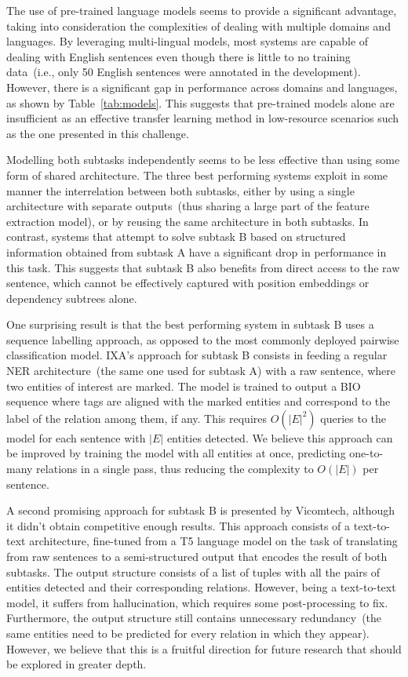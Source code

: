 \documentclass[a4paper,11pt,twocolumn,twoside]{article}
\begin{document}
The use of pre-trained language models seems to provide a significant advantage, taking into consideration the complexities of dealing with multiple domains and languages.
By leveraging multi-lingual models, most systems are capable of dealing with English sentences even though there is little to no training data~(i.e., only 50 English sentences were annotated in the development).
However, there is a significant gap in performance across domains and languages, as shown by Table~\ref{tab:models}.
This suggests that pre-trained models alone are insufficient as an effective transfer learning method in low-resource scenarios such as the one presented in this challenge.

Modelling both subtasks independently seems to be less effective than using some form of shared architecture.
The three best performing systems exploit in some manner the interrelation between both subtasks, either by using a single architecture with separate outputs~(thus sharing a large part of the feature extraction model), or by reusing the same architecture in both subtasks.
In contrast, systems that attempt to solve subtask B based on structured information obtained from subtask A have a significant drop in performance in this task.
This suggests that subtask B also benefits from direct access to the raw sentence, which cannot be effectively captured with position embeddings or dependency subtrees alone.

One surprising result is that the best performing system in subtask B uses a sequence labelling approach, as opposed to the most commonly deployed pairwise classification model.
IXA's approach for subtask B consists in feeding a regular NER architecture~(the same one used for subtask A) with a raw sentence, where two entities of interest are marked.
The model is trained to output a BIO sequence where tags are aligned with the marked entities and correspond to the label of the relation among them, if any.
This requires $O(|E|^2)$ queries to the model for each sentence with $|E|$ entities detected.
We believe this approach can be improved by training the model with all entities at once, predicting one-to-many relations in a single pass, thus reducing the complexity to $O(|E|)$ per sentence.

A second promising approach for subtask B is presented by Vicomtech, although it didn't obtain competitive enough results.
This approach consists of a text-to-text architecture, fine-tuned from a T5 language model on the task of translating from raw sentences to a semi-structured output that encodes the result of both subtasks.
The output structure consists of a list of tuples with all the pairs of entities detected and their corresponding relations.
However, being a text-to-text model, it suffers from hallucination, which requires some post-processing to fix.
Furthermore, the output structure still contains unnecessary redundancy~(the same entities need to be predicted for every relation in which they appear).
However, we believe that this is a fruitful direction for future research that should be explored in greater depth.
\end{document}
